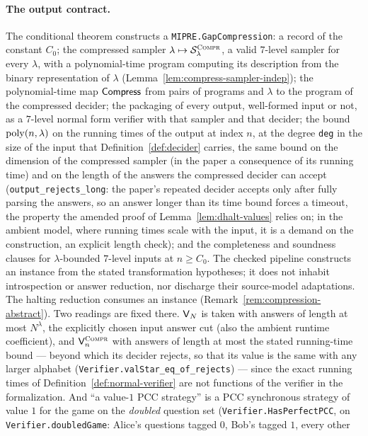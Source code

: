 \paragraph{The output contract.} The conditional theorem constructs a
\texttt{MIPRE.GapCompression}: a
record of the constant $C_0$; the compressed sampler $\lambda \mapsto \mathcal{S}^{\textsc{Compr}}_\lambda$, a
valid $7$-level sampler for every $\lambda$, with a polynomial-time program computing its
description from the binary representation of $\lambda$ (Lemma~\ref{lem:compress-sampler-indep});
the polynomial-time map $\mathsf{Compress}$ from pairs of programs and $\lambda$ to the program of
the compressed decider; the packaging of every output, well-formed input or not, as a
$7$-level normal form verifier with that sampler and that decider; the bound $\mathrm{poly}(n,
\lambda)$ on the running times of the output at index $n$, at the degree \texttt{deg} in the
size of the input that Definition~\ref{def:decider} carries, the same bound on the dimension of the compressed
sampler (in the paper a consequence of its running time) and on the length of the answers
the compressed decider can accept (\texttt{output\_rejects\_long}: the paper's repeated
decider accepts only after fully parsing the answers, so an answer longer than its time bound
forces a timeout, the property the amended proof of Lemma~\ref{lem:dhalt-values} relies on;
in the ambient model, where running times scale with the input, it is a demand on the
construction, an explicit length check); and the completeness and soundness clauses for
$\lambda$-bounded $7$-level inputs at $n \geq C_0$. The checked pipeline constructs
an instance from the stated transformation hypotheses;
it does not inhabit introspection or answer reduction, nor discharge their source-model
adaptations. The halting reduction consumes an instance
(Remark~\ref{rem:compression-abstract}). Two readings are fixed there.
$\mathsf{V}_N$ is taken with answers of length at most $N^\lambda$, the explicitly
chosen input answer cut (also the ambient runtime coefficient), and $\mathsf{V}^{\textsc{Compr}}_n$ with answers
of length at most the stated running-time bound --- beyond which its decider rejects, so
that its value is the same with any larger alphabet
(\texttt{Verifier.valStar\_eq\_of\_rejects}) --- since the exact running times of
Definition~\ref{def:normal-verifier} are not functions of the verifier in the
formalization. And ``a value-$1$ PCC strategy'' is a PCC synchronous strategy of value $1$
for the game on the \emph{doubled} question set (\texttt{Verifier.HasPerfectPCC}, on
\texttt{Verifier.doubledGame}: Alice's questions tagged $0$, Bob's tagged $1$, every other
